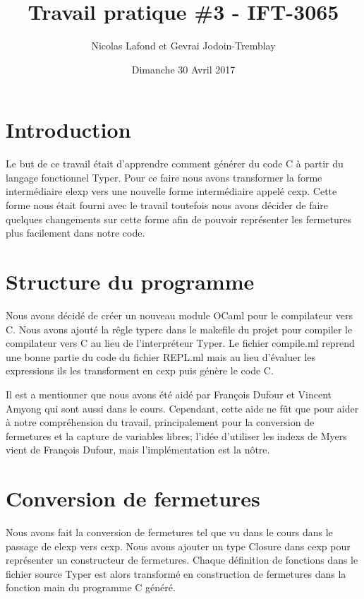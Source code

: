 \documentclass{article}
\begin{document}
\title{Travail pratique \#3 - IFT-3065}
\author{Nicolas Lafond et Gevrai Jodoin-Tremblay}
\date{Dimanche 30 Avril 2017}
\maketitle

\section{Introduction}
Le but de ce travail était d'apprendre comment générer du code C à partir du 
langage fonctionnel Typer. Pour ce faire nous avons transformer la forme
intermédiaire elexp vers une nouvelle forme intermédiaire appelé cexp. Cette
forme nous était fourni avec le travail toutefois nous avons décider de faire
quelques changements sur cette forme afin de pouvoir représenter les fermetures
plus facilement dans notre code.
 
\section{Structure du programme}
Nous avons décidé de créer un nouveau module OCaml pour le compilateur vers C.
Nous avons ajouté la rêgle typerc dans le makefile du projet pour compiler
le compilateur vers C au lieu de l'interpréteur Typer. Le fichier compile.ml
reprend une bonne partie du code du fichier REPL.ml mais au lieu d'évaluer
les expressions ils les transforment en cexp puis génère le code C.

Il est a mentionner que nous avons été aidé par François Dufour et Vincent
Amyong qui sont aussi dans le cours. Cependant, cette aide ne fût que pour aider
à notre compréhension du travail, principalement pour la conversion de
fermetures et la capture de variables libres; l'idée d'utiliser les indexs
de Myers vient de François Dufour, mais l'implémentation est la nôtre.

\section{Conversion de fermetures}
Nous avons fait la conversion de fermetures tel que vu dans le cours dans le
passage de elexp vers cexp. Nous avons ajouter un type Closure dans cexp pour
représenter un constructeur de fermetures. Chaque définition de fonctions dans
le fichier source Typer est alors transformé en construction de fermetures
dans la fonction main du programme C généré.
\end{document}
